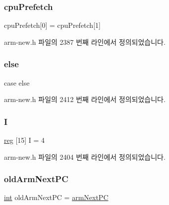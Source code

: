 \mbox{\label{arm-new_8h_a697b194786a904a0e87abfe17000dd72}} 
\subsubsection{\texorpdfstring{cpu\+Prefetch}{cpuPrefetch}}
{\footnotesize\ttfamily cpu\+Prefetch\mbox{[}0\mbox{]} = cpu\+Prefetch\mbox{[}1\mbox{]}}



arm-\/new.\+h 파일의 2387 번째 라인에서 정의되었습니다.

\mbox{\label{arm-new_8h_a70950f1dde0051dab8b447bdd9bea999}} 
\subsubsection{\texorpdfstring{else}{else}}
{\footnotesize\ttfamily case else}



arm-\/new.\+h 파일의 2412 번째 라인에서 정의되었습니다.

\mbox{\label{arm-new_8h_a782b7c7c9a56a2031f6270eac7f000d6}} 
\subsubsection{\texorpdfstring{I}{I}}
{\footnotesize\ttfamily \mbox{\hyperlink{_globals_8h_ae29faba89509024ffd1a292badcedf2d}{reg}} \mbox{[}15\mbox{]} I = 4}



arm-\/new.\+h 파일의 2404 번째 라인에서 정의되었습니다.

\mbox{\label{arm-new_8h_a50507170b2babce522bce8ba5d867fd8}} 
\subsubsection{\texorpdfstring{old\+Arm\+Next\+PC}{oldArmNextPC}}
{\footnotesize\ttfamily \mbox{\hyperlink{_util_8cpp_a0ef32aa8672df19503a49fab2d0c8071}{int}} old\+Arm\+Next\+PC = \mbox{\hyperlink{thumb_8h_a7e8bf67a6667274a53fc092b97961ca4}{arm\+Next\+PC}}}



